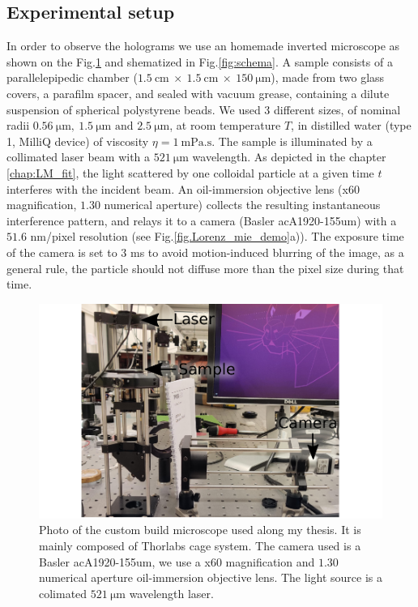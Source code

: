 \subsection{Experimental setup}
\label{chap:exp-setup}
In order to observe the holograms we use an homemade inverted microscope as shown on the Fig.\ref{fig:picture} and shematized in Fig.\ref{fig:schema}. A sample consists of a parallelepipedic chamber ($1.5 ~ \text{cm} ~ \times ~ 1.5 ~ \text{cm} ~ \times ~ 150 ~ \mathrm{\mu m} $), made from two glass covers, a parafilm spacer, and sealed with vacuum grease, containing a dilute suspension of spherical polystyrene beads. We used 3 different sizes, of nominal radii $0.56 ~ \mathrm{\mu m}, ~ 1.5 ~ \mathrm{\mu m} \text{ and } 2.5 ~ \mathrm{\mu m} $, at room temperature $T$, in distilled water (type 1, MilliQ device) of viscosity $\eta = 1 ~ \mathrm{mPa.s}$. The sample is illuminated by a collimated laser beam with a $521 ~ \mathrm{\mu m}$ wavelength. As depicted in the chapter \ref{chap:LM_fit}, the light scattered by one colloidal particle at a given time $t$ interferes with the incident beam. An oil-immersion objective lens (x60 magnification, $1.30$ numerical aperture) collects the resulting instantaneous interference pattern, and relays it to a camera (Basler acA1920-155um) with a $51.6$ nm/pixel resolution (see Fig.\ref{fig.Lorenz_mie_demo}a)). The exposure time of the camera is set to $3$ ms to avoid motion-induced blurring of the image, as a general rule, the particle should not diffuse more than the pixel size during that time.

\begin{figure}[!ht]
	\centering
	\includegraphics{02_body/chapter2/images/figures_setup/photo_setup.pdf}
	\caption{Photo of the custom build microscope used along my thesis. It is mainly composed of Thorlabs cage system. The camera used is a Basler acA1920-155um, we use a x60 magnification and $1.30$ numerical aperture oil-immersion objective lens. The light source is a colimated  $521 ~ \mathrm{\mu m}$ wavelength laser.}
	\label{fig:picture}
\end{figure}


